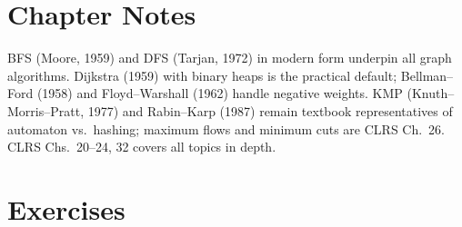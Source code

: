 \section{Chapter Notes}
BFS (Moore, 1959) and DFS (Tarjan, 1972) in modern form underpin all graph algorithms. Dijkstra (1959) with binary heaps is the practical default; Bellman--Ford (1958) and Floyd--Warshall (1962) handle negative weights. KMP (Knuth--Morris--Pratt, 1977) and Rabin--Karp (1987) remain textbook representatives of automaton vs.\ hashing; maximum flows and minimum cuts are CLRS Ch.~26. CLRS Chs.~20--24, 32 covers all topics in depth.

\section{Exercises}
\label{sec:ch07-exercises}
